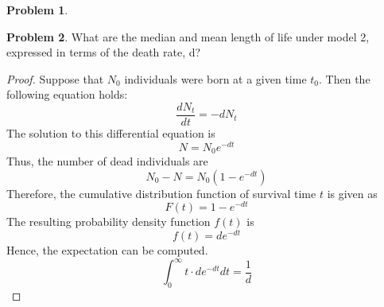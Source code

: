 \documentclass[12pt]{report}
\theoremstyle{definition}
\newtheorem{problem}{Problem}[chapter]
\begin{document}
\begin{problem}
        \end{problem}

        \begin{problem}
            What are the median and mean length of life under model 2, expressed in terms of the death rate, d?
            \begin{proof}
                Suppose that $N_0$ individuals were born at a given time $t_0$. 
                Then the following equation holds:
                \begin{equation*}
                    \frac{dN_t}{dt} = -dN_t
                \end{equation*}
                The solution to this differential equation is 
                \begin{equation*}
                    N = N_0 e^{-dt}
                \end{equation*}
                Thus, the number of dead individuals are
                \begin{equation*}
                    N_0 - N = N_0(1-e^{-dt})
                \end{equation*}
                Therefore, the cumulative distribution function of survival time $t$ is given as
                \begin{equation*}
                    F(t) = 1- e^{-dt}
                \end{equation*}
                The resulting probability density function $f(t)$ is
                \begin{equation*}
                    f(t) = de^{-dt}
                \end{equation*}
                Hence, the expectation can be computed.
                \begin{equation*}
                    \int_{0}^{\infty} {t \cdot de^{-dt} dt} = \frac{1}{d}
                \end{equation*}
            \end{proof}
        \end{problem}
    
\end{document}
